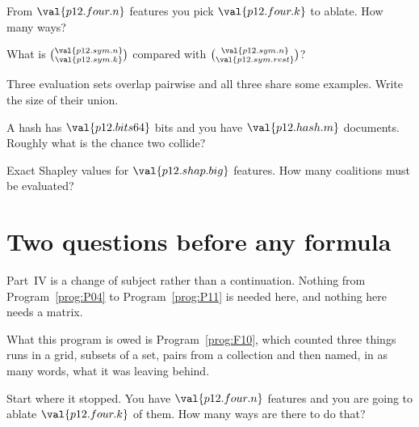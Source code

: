 \begin{quiz}
\item From $\val{p12.four.n}$ features you pick $\val{p12.four.k}$ to ablate.
  How many ways? 
\item What is $\binom{\val{p12.sym.n}}{\val{p12.sym.k}}$ compared with
  $\binom{\val{p12.sym.n}}{\val{p12.sym.rest}}$? 
\item Three evaluation sets overlap pairwise and all three share some
  examples. Write the size of their union. 
\item A hash has $\val{p12.bits64}$ bits and you have
  $\val{p12.hash.m}$ documents. Roughly what is the chance two collide?
\item Exact Shapley values for $\val{p12.shap.big}$ features. How many
  coalitions must be evaluated? 
\end{quiz}

\section{Two questions before any formula}
\label{sec:P12-two-questions}

\begin{fr}
Part~IV is a change of subject rather than a continuation. Nothing from
Program~\ref{prog:P04} to Program~\ref{prog:P11} is needed here, and nothing
here needs a matrix.

What this program is owed is Program~\ref{prog:F10}, which counted three
things \dash{} runs in a grid, subsets of a set, pairs from a collection
\dash{} and then named, in as many words, what it was leaving behind.

Start where it stopped. You have $\val{p12.four.n}$ features and you are going
to ablate $\val{p12.four.k}$ of them. How many ways are there to do that?
\dotline
\nextframe
\end{fr}


